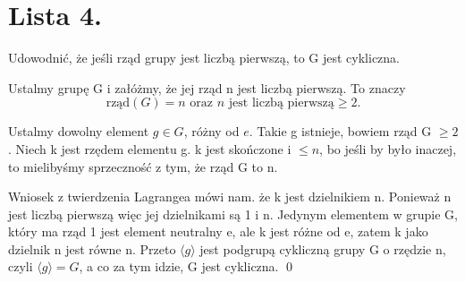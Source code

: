 \chapter{Lista 4.}

\begin{problem}[1]

	Udowodnić, że jeśli rząd grupy jest liczbą pierwszą, to G jest cykliczna.
\end{problem}
\begin{solution}
	
	Ustalmy grupę G i załóżmy, że jej rząd n jest liczbą pierwszą. To znaczy \[
	\text{rząd}\left( G \right) = n\text{ oraz } n \text{ jest liczbą pierwszą} \ge 2
	.\] 

	Ustalmy dowolny element $g \in G$, różny od $e$. Takie g istnieje, bowiem rząd G $\ge 2$. Niech k jest rzędem elementu g. k jest skończone i $\le n$, bo jeśli by było inaczej, to mielibyśmy sprzeczność z tym, że rząd G to n.
	
	Wniosek z twierdzenia Lagrangea mówi nam. że k jest dzielnikiem n. Ponieważ n jest liczbą pierwszą więc jej dzielnikami są 1 i n. Jedynym elementem w grupie G, który ma rząd 1 jest element neutralny e, ale k jest różne od e, zatem k jako dzielnik n jest równe n. Przeto $\langle g \rangle $ jest podgrupą cykliczną grupy G o rzędzie n, czyli $\langle g \rangle = G$, a co za tym idzie, G jest cykliczna.
\hfill\qed
\end{solution}

